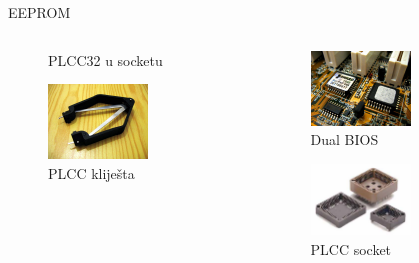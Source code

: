 \documentclass[croatian,t]{beamer} %
\begin{document}
\begin{frame}{EEPROM}
\begin{columns}
\begin{column}{4cm}
\begin{figure}
					\caption{PLCC32 u socketu}
				\end{figure}
				\begin{figure}
					\includegraphics[width=0.62\textwidth]{../pics/800px-Plcc_tool.jpg}
					\caption{PLCC kliješta}
				\end{figure}
			\end{column}
			\begin{column}{4cm}
				\begin{figure}
					\includegraphics[width=0.62\textwidth]{../pics/800px-Dual_plcc32_soldered.jpg}
					\caption{Dual BIOS}
				\end{figure}
				\begin{figure}
					\includegraphics[width=0.62\textwidth]{../pics/plcc_socket.jpg}
					\caption{PLCC socket}
				\end{figure}
			\end{column}
		\end{columns}
    \end{frame}
\end{document}
